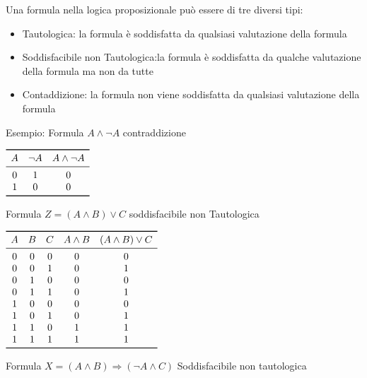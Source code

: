 \begin{enumerate}
Una formula nella logica proposizionale può essere di tre diversi tipi:

\begin{itemize}
  \item Tautologica: la formula è soddisfatta da qualsiasi valutazione della formula
  \item Soddisfacibile non Tautologica:la formula è soddisfatta da qualche valutazione
        della formula ma non da tutte
  \item Contaddizione: la formula non viene soddisfatta da qualsiasi valutazione della formula
\end{itemize}

Esempio:\newline
Formula $A \land \neg A$ \quad contraddizione

$\begin{array}{ccc}
\toprule A & \neg A & A \land \neg A \\
\midrule
        0 & 1 & 0 \\
        1 & 0 & 0 \\
\bottomrule
\end{array}$\newpage

Formula $Z = (A \land B) \lor C$  soddisfacibile non Tautologica

$\begin{array}{ccccc}
\toprule A & B & C & A \land B & (A \land B) \lor C \\
\midrule
         0 & 0 & 0 & 0 & 0 \\
         0 & 0 & 1 & 0 & 1 \\
         0 & 1 & 0 & 0 & 0 \\
         0 & 1 & 1 & 0 & 1 \\
         1 & 0 & 0 & 0 & 0 \\
         1 & 0 & 1 & 0 & 1 \\
         1 & 1 & 0 & 1 & 1 \\
         1 & 1 & 1 & 1 & 1 \\
\bottomrule
\end{array}$\newline

Formula $X = (A \land B) \Rightarrow (\neg A \land C)$ \quad Soddisfacibile  non tautologica\newline


\end{enumerate}
